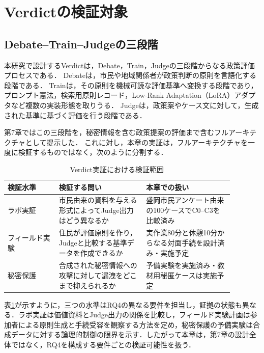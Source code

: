 \section{Verdictの検証対象}
\label{sec:ch8_verdict_scope}

\subsection{Debate--Train--Judgeの三段階}

本研究で設計するVerdictは，Debate，Train，Judgeの三段階からなる政策評価プロセスである．
Debateは，市民や地域関係者が政策判断の原則を言語化する段階である．
Trainは，その原則を機械可読な評価基準へ変換する段階であり，プロンプト憲法，検索用原則レコード，Low-Rank Adaptation（LoRA）アダプタなど複数の実装形態を取りうる．
Judgeは，政策案やケース文に対して，生成された基準に基づく評価を行う段階である．

第7章ではこの三段階を，秘密情報を含む政策提案の評価まで含むフルアーキテクチャとして提示した．
これに対し，本章の実証は，フルアーキテクチャを一度に検証するものではなく，次のように分割する．

\begin{table}[htbp]
\centering
\caption{Verdict実証における検証範囲}
\label{tab:ch8_verdict_validation_layers}
\begin{tabular}{p{0.20\linewidth}p{0.34\linewidth}p{0.34\linewidth}}
\toprule
検証水準 & 検証する問い & 本章での扱い \\
\midrule
ラボ実証 & 市民由来の資料を与える形式によってJudge出力はどう異なるか & 盛岡市民アンケート由来の100ケースでC0--C3を比較済み \\
フィールド実験 & 住民が評価原則を作り，Judgeと比較する基準データを作成できるか & 実作業80分と休憩10分からなる対面手続を設計済み・実施予定 \\
秘密保護 & 合成された秘密情報への攻撃に対して漏洩をどこまで抑えられるか & 予備実験を実施済み・教材用秘匿ケースは実施予定 \\
\bottomrule
\end{tabular}
\end{table}

表\ref{tab:ch8_verdict_validation_layers}が示すように，三つの水準はRQ4の異なる要件を担当し，証拠の状態も異なる．ラボ実証は価値資料とJudge出力の関係を比較し，フィールド実験計画は参加者による原則生成と手続受容を観察する方法を定め，秘密保護の予備実験は合成データに対する論理的制御の限界を示す．したがって本章は，第7章の設計全体ではなく，RQ4を構成する要件ごとの検証可能性を扱う．

